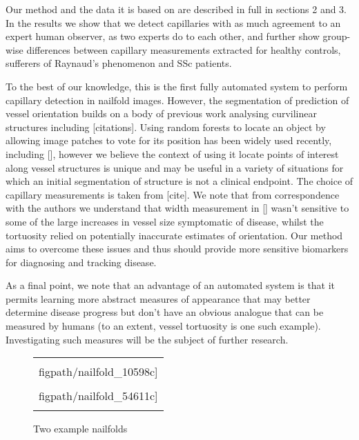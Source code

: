 \documentclass[runningheads,a4paper]{llncs}
\def\figpath{./figs}
\def\figpath{./figs}
\begin{document}
Our method and the data it is based on are described in full in sections 2 and 3. In the results we show that we detect capillaries with as much agreement to an expert human observer, as two experts do to each other, and further show group-wise differences between capillary measurements extracted for healthy controls, sufferers of Raynaud's phenomenon and SSc patients.

To the best of our knowledge, this is the first fully automated system to perform capillary detection in nailfold images. However, the segmentation of prediction of vessel orientation builds on a body of previous work analysing curvilinear structures including [citations]. Using random forests to locate an object by allowing image patches to vote for its position has been widely used recently, including [], however we believe the context of using it locate points of interest along vessel structures is unique and may be useful in a variety of situations for which an initial segmentation of structure is not a clinical endpoint. The choice of capillary measurements is taken from [cite]. We note that from correspondence with the authors we understand that width measurement in [] wasn't sensitive to some of the large increases in vessel size symptomatic of disease, whilst the tortuosity relied on potentially inaccurate estimates of orientation. Our method aims to overcome these issues and thus should provide more sensitive biomarkers for diagnosing and tracking disease.

As a final point, we note that an advantage of an automated system is that it permits learning more abstract measures of appearance that may better determine disease progress but don't have an obvious analogue that can be measured by humans (to an extent, vessel tortuosity is one such example). Investigating such measures will be the subject of further research.
%
\begin{figure}[t]
\centering
\begin{tabular}{@{}c@{}}
\texttt{[image: \\figpath/nailfold\_10598c]} \\
\texttt{[image: \\figpath/nailfold\_54611c]} \\
\noalign{\smallskip}
\end{tabular}
%
\caption{Two example nailfolds}
\label{f:capillaroscopy}
\end{figure}
%
\end{document}
